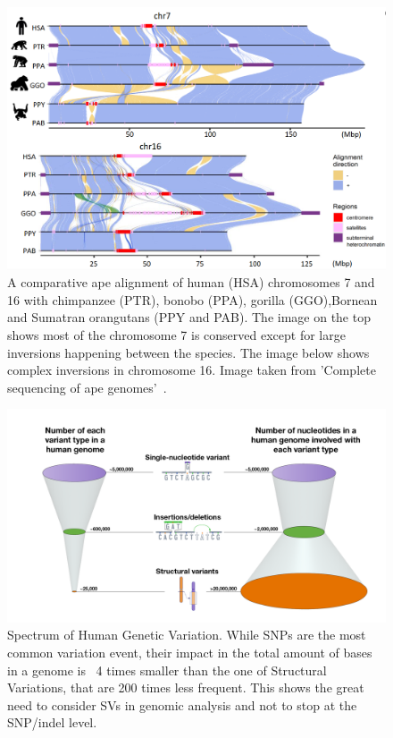 \begin{figure}[h!]
	\centering
	\includegraphics[width=\linewidth]{figures/background/genome_diff.png}
	\caption[Genomic difference in chromosome 7 and 16 of 5 primate species.]{A comparative ape alignment of human (HSA) chromosomes 7 and 16 with chimpanzee (PTR), bonobo (PPA), gorilla (GGO),Bornean and Sumatran orangutans (PPY and PAB). The image on the top shows most of the chromosome 7 is conserved except for large inversions happening between the species. The image below shows complex inversions in chromosome 16. Image taken from 'Complete sequencing of ape genomes'~\cite{ape_genomes}.}
	\label{fig:chromosome_diff}
\end{figure}

\begin{figure}[h!]\clearpage
	\centering
	\includegraphics[width=.95\linewidth]{figures/background/genomic_spectrum.png}
	\caption[Spectrum of Human Genetic Variation.]{Spectrum of Human Genetic Variation. While SNPs are the most common variation event, their impact in the total amount of bases in a genome is ~4 times smaller than the one of Structural Variations, that are 200 times less frequent. This shows the great need to consider SVs in genomic analysis and not to stop at the SNP/indel level.\\}
	\label{fig:variation_spectrum}
\end{figure}

